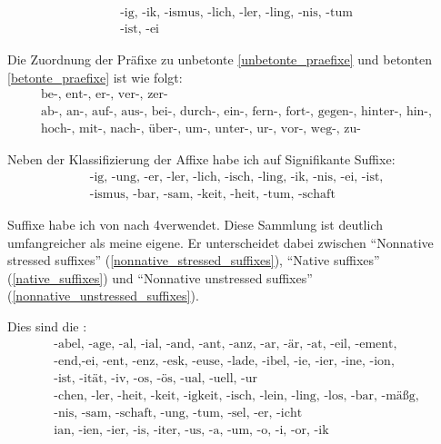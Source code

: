 \begin{gather}
    \label{unbetonte_suffixe}
    \textrm{-ig, -ik, -ismus, -lich, -ler, -ling, -nis, -tum}\\
    \label{betonte_suffixe}
    \textrm{-ist, -ei}
\end{gather}

Die Zuordnung der Präfixe zu unbetonte \ref{unbetonte_praefixe} und betonten \ref{betonte_praefixe} ist wie folgt:
\begin{gather}
    \label{unbetonte_praefixe}
    \textrm{be-, ent-, er-, ver-, zer-}\\
    \label{betonte_praefixe}
    \textrm{ab-, an-, auf-, aus-, bei-, durch-, ein-, fern-, fort-, gegen-, hinter-, hin-,}\\
    \textrm{hoch-, mit-, nach-, über-, um-, unter-, ur-, vor-, weg-, zu-}\nonumber
\end{gather}

Neben der Klassifizierung der Affixe habe ich auf 
Signifikante Suffixe:
\begin{gather}
    \textrm{-ig, -ung, -er, -ler, -lich, -isch, -ling, -ik, -nis, -ei, -ist,}\\
    \textrm{-ismus, -bar, -sam, -keit, -heit, -tum, -schaft}\nonumber
\end{gather}


Suffixe habe ich von \cite[S.~28]{Giegerich1985} nach \cite{Benware1980}4verwendet. Diese Sammlung ist deutlich umfangreicher als meine eigene. Er unterscheidet dabei zwischen \enquote{Nonnative stressed suffixes} (\ref{nonnative_stressed_suffixes}), \enquote{Native suffixes} (\ref{native_suffixes}) und \enquote{Nonnative unstressed suffixes} (\ref{nonnative_unstressed_suffixes}).

Dies sind die :
\begin{gather}
    \label{nonnative_stressed_suffixes}
    \textrm{-abel, -age, -al, -ial, -and, -ant, -anz, -ar, -är, -at, -eil, -ement,}\\
    \textrm{-end,-ei, -ent, -enz, -esk, -euse, -lade, -ibel, -ie, -ier, -ine, -ion,}\nonumber\\
    \textrm{-ist, -ität, -iv, -os, -ös, -ual, -uell, -ur}\nonumber\\
    \label{native_suffixes}
    \textrm{-chen, -ler, -heit, -keit, -igkeit, -isch, -lein, -ling, -los, -bar, -mäßg,}\\
    \textrm{-nis, -sam, -schaft, -ung, -tum, -sel, -er, -icht}\nonumber\\
    \label{nonnative_unstressed_suffixes}
    \textrm{ian, -ien, -ier, -is, -iter, -us, -a, -um, -o, -i, -or, -ik}
\end{gather}

